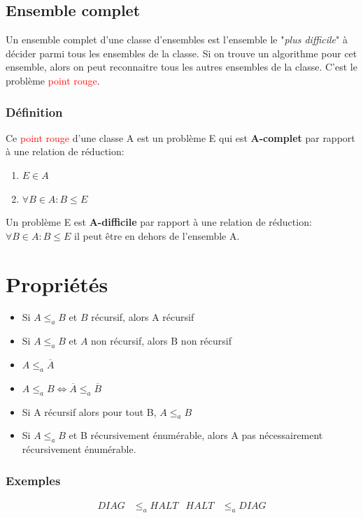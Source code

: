 \documentclass{report}
\begin{document}
\subsection{Ensemble complet}
Un ensemble complet d'une classe d'ensembles est l'ensemble le "\textit{plus difficile}" à décider parmi tous les ensembles de la classe. Si on trouve un algorithme pour cet ensemble, alors on peut reconnaitre tous les autres ensembles de la classe. C'est le problème \textcolor{red}{point rouge}.

\subsubsection{Définition}
Ce \textcolor{red}{point rouge} d'une classe A est un problème E qui est \textbf{A-complet} par rapport à une relation de réduction:
\begin{enumerate}
\item $E \in A$
\item $\forall B \in A : B \leqslant E$ 
\end{enumerate}
Un problème E est \textbf{A-difficile} par rapport à une relation de réduction: $\forall B \in A : B \leqslant E$ il peut être en dehors de l'ensemble A.

\section{Propriétés}
\begin{itemize}
\item Si $A \leqslant_a B$ et $B$ récursif, alors A récursif
\item Si $A \leqslant_a B$ et $A$ non récursif, alors B non récursif
\item $A \leqslant_a \overline{A}$
\item $A \leqslant_a B \Leftrightarrow \overline{A} \leqslant_a \overline{B}$
\item Si A récursif alors pour tout B, $A \leqslant_a B$
\item Si $A \leqslant_a B$ et B récursivement énumérable, alors A pas nécessairement récursivement énumérable.
\end{itemize} 

\subsubsection{Exemples}
\begin{align*}
DIAG &\leqslant_a HALT & HALT &\leqslant_a DIAG
\end{align*}
\end{document}
